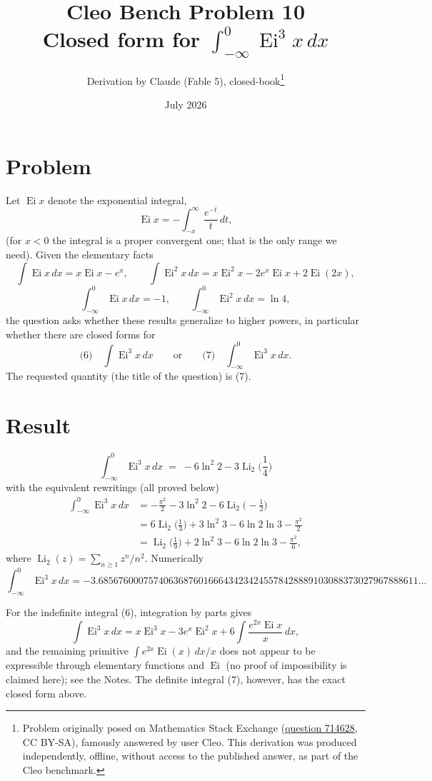 \documentclass[11pt]{article}
\title{Cleo Bench Problem 10\\[1ex]\large Closed form for $\int_{-\infty}^0\operatorname{Ei}^3x\,dx$}
\author{Derivation by Claude (Fable 5), closed-book\thanks{Problem originally
posed on Mathematics Stack Exchange
(\href{https://math.stackexchange.com/q/714628}{question 714628}, CC BY-SA),
famously answered by user Cleo. This derivation was produced independently,
offline, without access to the published answer, as part of the Cleo benchmark.}}
\date{July 2026}
\theoremstyle{remark}
\begin{document}
\maketitle

\section*{Problem}

Let $\operatorname{Ei}x$ denote the exponential integral,
$$\operatorname{Ei}x=-\int_{-x}^{\infty}\frac{e^{-t}}{t}\,dt ,$$
(for $x<0$ the integral is a proper convergent one; that is the only range we need). Given the elementary facts
$$\int\operatorname{Ei}x\,dx=x\operatorname{Ei}x-e^{x},\qquad
\int\operatorname{Ei}^{2}x\,dx=x\operatorname{Ei}^{2}x-2e^{x}\operatorname{Ei}x+2\operatorname{Ei}(2x),$$
$$\int_{-\infty}^{0}\operatorname{Ei}x\,dx=-1,\qquad
\int_{-\infty}^{0}\operatorname{Ei}^{2}x\,dx=\ln 4 ,$$
the question asks whether these results generalize to higher powers, in particular whether there are closed forms for
$$\text{(6)}\quad\int\operatorname{Ei}^{3}x\,dx
\qquad\text{or}\qquad
\text{(7)}\quad\int_{-\infty}^{0}\operatorname{Ei}^{3}x\,dx .$$
The requested quantity (the title of the question) is (7).

\section*{Result}

$$\boxed{\;\int_{-\infty}^{0}\operatorname{Ei}^{3}x\,dx
\;=\;-6\ln^{2}2-3\operatorname{Li}_{2}\!\Big(\frac14\Big)\;}
$$
with the equivalent rewritings (all proved below)
$$\begin{aligned}
\int_{-\infty}^{0}\operatorname{Ei}^{3}x\,dx
&=-\frac{\pi^{2}}{2}-3\ln^{2}2-6\operatorname{Li}_{2}\!\Big(-\frac12\Big)\\
&=6\operatorname{Li}_{2}\!\Big(\frac13\Big)+3\ln^{2}3-6\ln2\ln3-\frac{\pi^{2}}{2}\\
&=\operatorname{Li}_{2}\!\Big(\frac19\Big)+2\ln^{2}3-6\ln2\ln3-\frac{\pi^{2}}{6},
\end{aligned}$$
where $\operatorname{Li}_2(z)=\sum_{n\ge1}z^n/n^2$. Numerically
{\footnotesize$$\int_{-\infty}^{0}\operatorname{Ei}^{3}x\,dx=
-3.6856760007574063687601666434234245578428889103088373027967888611\ldots$$}

For the indefinite integral (6), integration by parts gives
$$\int\operatorname{Ei}^{3}x\,dx=x\operatorname{Ei}^{3}x-3e^{x}\operatorname{Ei}^{2}x+6\int\frac{e^{2x}\operatorname{Ei}x}{x}\,dx,$$
and the remaining primitive $\int e^{2x}\operatorname{Ei}(x)\,dx/x$ does not appear to be expressible through elementary functions and $\operatorname{Ei}$ (no proof of impossibility is claimed here); see the Notes. The definite integral (7), however, has the exact closed form above.
\end{document}
